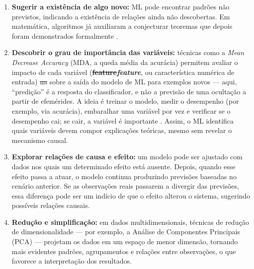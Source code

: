 \documentclass[msc]{on} %
\makeatletter
\providecommand{\DIFaddtex}[1]{{\protect\color{red}#1}} %
\providecommand{\DIFdeltex}[1]{{\protect\color{red}\sout{#1}}} %
\providecommand{\DIFaddbegin}{} %
\providecommand{\DIFaddend}{} %
\providecommand{\DIFdelbegin}{} %
\providecommand{\DIFdelend}{} %
\providecommand{\DIFadd}[1]{\texorpdfstring{\DIFaddtex{#1}}{#1}} %
\providecommand{\DIFdel}[1]{\texorpdfstring{\DIFdeltex{#1}}{}} %
\let\sout@orig\sout %
\renewcommand{\sout}[1]{\ifmmode\text{\sout@orig{\ensuremath{#1}}}\else\sout@orig{#1}\fi} %
\makeatother
\begin{document}
\DIFaddbegin \begin{enumerate}
	\item[\DIFadd{(i)}] \DIFaddend \textbf{Sugerir a existência de algo novo:} ML pode encontrar padrões não previstos, indicando a existência de relações ainda não descobertas. Em matemática, algoritmos já auxiliaram a conjecturar teoremas que depois foram demonstrados formalmente \citep{gryak2018conjugacy}.

	\DIFaddbegin \item[\DIFadd{(ii)}] \DIFaddend \textbf{Descobrir o grau de importância das variáveis:} técnicas como \DIFaddbegin \DIFadd{a }\DIFaddend \textit{Mean Decrease Accuracy} (MDA\DIFaddbegin \DIFadd{, a queda média da acurácia}\DIFaddend ) permitem avaliar o impacto de cada variável (\textbf{\DIFdelbegin \DIFdel{feature}\DIFdelend \DIFaddbegin \textit{\DIFadd{feature}}\DIFaddend }, ou característica numérica de entrada) \DIFdelbegin \DIFdel{na }\DIFdelend \DIFaddbegin \DIFadd{sobre a saída do modelo de ML para exemplos novos --- aqui, ``}\DIFaddend predição\DIFaddbegin \DIFadd{'' é a resposta do classificador, e não a previsão de uma ocultação a partir de efemérides}\DIFaddend . A ideia é treinar o modelo, medir o desempenho (por exemplo, via acurácia), embaralhar uma variável por vez e verificar se o desempenho cai; se cair, a variável é importante \citep{liu2004comparative}. Assim, o ML identifica quais variáveis devem compor explicações teóricas, mesmo sem revelar o mecanismo causal.

	\DIFaddbegin \item[\DIFadd{(iii)}] \DIFaddend \textbf{Explorar relações de causa e efeito:} um modelo pode ser ajustado com dados nos quais um determinado efeito está ausente. Depois, quando esse efeito passa a atuar, o modelo continua produzindo previsões baseadas no cenário anterior. Se as observações reais passarem a divergir das previsões, essa diferença pode ser um indício de que o efeito alterou o sistema, sugerindo possíveis relações causais.

	\DIFaddbegin \item[\DIFadd{(iv)}] \DIFaddend \textbf{Redução e simplificação:} em dados multidimensionais, técnicas de redução de dimensionalidade — por exemplo, a Análise de Componentes Principais (PCA) — projetam os dados em um espaço de menor dimensão, tornando mais evidentes padrões, agrupamentos e relações entre observações, o que favorece a interpretação dos resultados.


\end{enumerate}
\end{document}
